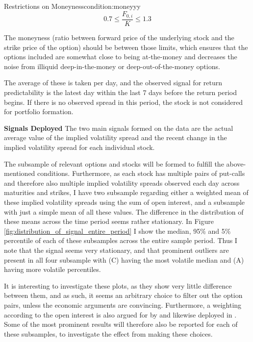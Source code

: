\begin{mycondition}{Restrictions on Moneyness}{condition:moneyyy}
	$$ 0.7 \leq \frac{F_{0,i}}{K} \leq 1.3 $$
	
	The moneyness (ratio between forward price of the underlying stock and the strike price of the option) should be between those limits, which ensures that the options included are somewhat close to being at-the-money and decreases the noise from illiquid deep-in-the-money or deep-out-of-the-money options.
\end{mycondition}


The average of these is taken per day, and the observed signal for return predictability is the latest day within the last 7 days before the return period begins. If there is no observed spread in this period, the stock is not considered for portfolio formation.

\textbf{Signals Deployed} The two main signals formed on the data are the actual average value of the implied volatility spread and the recent change in the implied volatility spread for each individual stock. 

The subsample of relevant options and stocks will be formed to fulfill the above-mentioned conditions. Furthermore, as each stock has multiple pairs of put-calls and therefore also multiple implied volatility spreads observed each day across maturities and strikes, I have two subsample regarding either a weighted mean of these implied volatility spreads using the sum of open interest, and a subsample with just a simple mean of all these values. The difference in the distribution of these means across the time period seems rather stationary. In Figure \ref{fig:distribution_of_signal_entire_period} I show the median, 95\% and 5\% percentile of each of these subsamples across the entire sample period. Thus I note that the signal seems very stationary, and that prominent outliers are present in all four subsample with (C) having the most volatile median and (A) having more volatile percentiles. 

It is interesting to investigate these plots, as they show very little difference between them, and as such, it seems an arbitrary choice to filter out the option pairs, unless the economic arguments are convincing. Furthermore, a weighting according to the open interest is also argued for by \cite{cremers2010deviations} and likewise deployed in \cite{shang2016option}. Some of the most prominent results will therefore also be reported for each of these subsamples, to investigate the effect from making these choices. 

